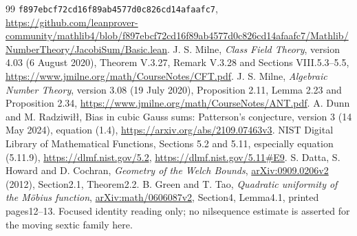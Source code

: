 \begin{thebibliography}{99}
\texttt{f897ebcf72cd16f89ab4577d0c826cd14afaafc7},
\url{https://github.com/leanprover-community/mathlib4/blob/f897ebcf72cd16f89ab4577d0c826cd14afaafc7/Mathlib/NumberTheory/JacobiSum/Basic.lean}.
 J. S. Milne, \emph{Class Field Theory}, version 4.03
(6 August 2020), Theorem V.3.27, Remark V.3.28 and Sections VIII.5.3--5.5,
\url{https://www.jmilne.org/math/CourseNotes/CFT.pdf}.
 J. S. Milne, \emph{Algebraic Number Theory}, version 3.08
(19 July 2020), Proposition 2.11, Lemma 2.23 and Proposition 2.34,
\url{https://www.jmilne.org/math/CourseNotes/ANT.pdf}.
 A. Dunn and M. Radziwi\l\l,
Bias in cubic Gauss sums: Patterson's conjecture, version 3
(14 May 2024), equation (1.4),
\url{https://arxiv.org/abs/2109.07463v3}.
 NIST Digital Library of Mathematical Functions,
Sections 5.2 and 5.11, especially equation (5.11.9),
\url{https://dlmf.nist.gov/5.2}, \url{https://dlmf.nist.gov/5.11#E9}.
 S. Datta, S. Howard and D. Cochran, \emph{Geometry of the Welch Bounds}, \href{https://arxiv.org/abs/0909.0206v2}{arXiv:0909.0206v2} (2012), Section2.1, Theorem2.2.
 B. Green and T. Tao,
\emph{Quadratic uniformity of the M\"obius function},
\href{https://arxiv.org/abs/math/0606087v2}{arXiv:math/0606087v2},
Section4, Lemma4.1, printed pages12--13. Focused identity reading only;
no nilsequence estimate is asserted for the moving sextic family here.
\end{thebibliography}
